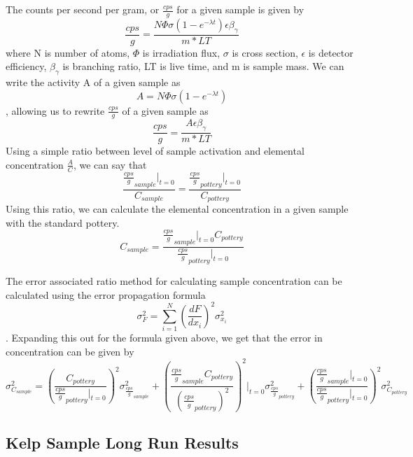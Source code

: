 \documentclass[]{article}
\begin{document}
The counts per second per gram, or $\frac{cps}{g}$ for a given sample is given by $$\frac{cps}{g} = \frac{N\Phi\sigma(1-e^{-\lambda t})\epsilon \beta_{ \gamma}}{m * LT}$$ where N is number of atoms, $\Phi$ is irradiation flux, $\sigma$ is cross section, $\epsilon$ is detector efficiency, $\beta_{\gamma}$ is branching ratio, LT is live time, and m is sample mass. We can write the activity A of a given sample as $$A=N\Phi\sigma(1-e^{-\lambda t})$$, allowing us to rewrite $\frac{cps}{g}$ of a given sample as $$\frac{cps}{g} = \frac{A\epsilon\beta_{\gamma}}{m*LT}$$ Using a simple ratio between level of sample activation and elemental concentration $\frac{A}{C}$, we can say that $$\frac{\frac{cps}{g}_{sample}|_{t=0}}{C_{sample}} = \frac{\frac{cps}{g}_{pottery}|_{t=0}}{C_{pottery}}$$ Using this ratio, we can calculate the elemental concentration in a given sample with the standard pottery. $$C_{sample} = \frac{\frac{cps}{g}_{sample}|_{t=0} C_{pottery}}{\frac{cps}{g}_{pottery}|_{t=0}}$$

The error associated ratio method for calculating sample concentration can be calculated using the error propagation formula $$\sigma_F^2 = \sum_{i=1}^N (\frac{dF}{dx_i})^2 \sigma_{x_i}^2$$. Expanding this out for the formula given above, we get that the error in concentration can be given by $$\sigma_{C_{sample}}^2 = (\frac{C_{pottery}}{\frac{cps}{g}_{pottery}|_{t=0}})^2\sigma_{\frac{cps}{g}_{sample}}^2 +  (\frac{\frac{cps}{g}_{sample} C_{pottery}}{(\frac{cps}{g}_{pottery})^2})^2|_{t=0}\sigma_{\frac{cps}{g}_{pottery}}^2 +  (\frac{\frac{cps}{g}_{sample}|_{t=0}}{\frac{cps}{g}_{pottery}|_{t=0}})^2\sigma_{C_{pottery}}^2$$

\subsection{Kelp Sample Long Run Results}
\end{document}
